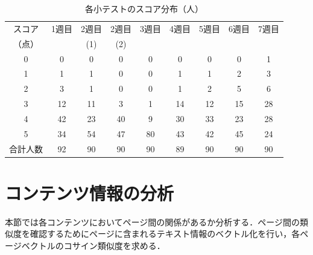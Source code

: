 \documentclass[a4paper,12pt]{ltjsreport}
\begin{document}

\begin{table}[tbp]
  \centering
  \caption{各小テストのスコア分布（人）}
  \label{tb:scoredistribution}
  \begin{tabular}{c||c|c|c|c|c|c|c|c}
    スコア & 1週目 & 2週目 & 2週目 & 3週目 & 4週目 & 5週目 & 6週目 & 7週目 \\
    （点） &  & (1) & (2) &  &  &  &  &  \\ \hline\hline
    0 & 0 & 0 & 0 & 0 & 0 & 0 & 0 & 1 \\ \hline
    1 & 1 & 1 & 0 & 0 & 1 & 1 & 2 & 3 \\ \hline
    2 & 3 & 1 & 0 & 0 & 1 & 2 & 5 & 6 \\\hline
    3 & 12 & 11 & 3 & 1 & 14 & 12 & 15 & 28 \\ \hline
    4 & 42 & 23 & 40 & 9 & 30 & 33 & 23 & 28 \\ \hline
    5 & 34 & 54 & 47 & 80 & 43 & 42 & 45 & 24 \\ \hline\hline
    合計人数 & 92 & 90 & 90 & 90 & 89 & 90 & 90 & 90 \\ \hline
  \end{tabular}
\end{table}




\section{コンテンツ情報の分析}\label{sec:bunseki}

本節では各コンテンツにおいてページ間の関係があるか分析する．ページ間の類似度を確認するためにページに含まれるテキスト情報のベクトル化を行い，各ページベクトルのコサイン類似度を求める．
\end{document}
